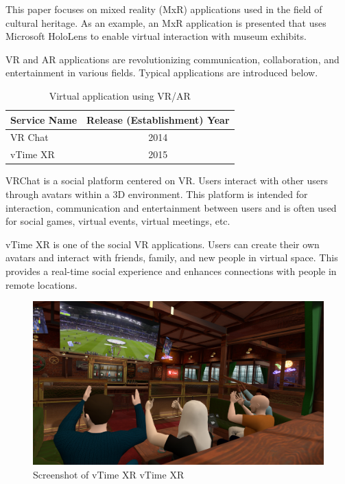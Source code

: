 \documentclass[12pt]{article}
\begin{document}
This paper \cite{ref4} focuses on mixed reality (MxR) applications used in the
field of cultural
heritage. As an example, an MxR application is presented that uses Microsoft
HoloLens to enable virtual interaction with museum exhibits.

VR and AR applications are
revolutionizing communication, collaboration, and entertainment in various
fields. Typical applications are introduced below.

\begin{table}[h]
    \begin{center}
        \begin{tabular}{|l|c|} \hline
            Service Name & Release (Establishment) Year \\ \hline
            VR Chat      & 2014                         \\
            vTime XR     & 2015                         \\ \hline
        \end{tabular}
        \caption{Virtual application using VR/AR}
    \end{center}
\end{table}

VRChat is a social platform centered on VR. Users interact with other users
through avatars within a 3D environment. This platform is intended for
interaction, communication and entertainment between users and is often used
for social games, virtual events, virtual meetings, etc.

vTime XR is one of the social VR applications. Users can create their own
avatars and interact with friends, family, and new people in virtual space.
This provides a real-time social experience and enhances connections with
people in remote locations.

\begin{figure}[H]
    \centering
    \includegraphics[width=1\textwidth]{vtimexr.png}
    \caption{Screenshot of vTime XR \textcopyright vTime XR}
    \label{fig:my_label}
\end{figure}
\end{document}
